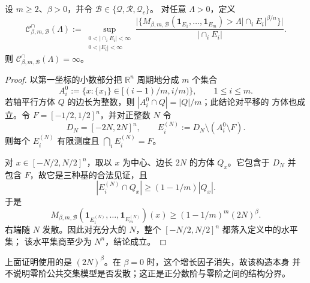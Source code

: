 \begin{proposition}[正分数阶下公共交集分母必然发散]\label{ml:intersection-divergence}
设 $m\geq2$、$\beta>0$，并令 $\mathcal B\in\{\mathcal Q,\mathcal R,\mathcal Q_c\}$。
对任意 $\Lambda>0$，定义
\[
 \mathcal C^{\cap}_{\beta,m,\mathcal B}(\Lambda)
 :=\sup_{\substack{0<|\cap_iE_i|<\infty\\0<|E_i|<\infty}}
 \frac{\bigl|\{M_{\beta,m,\mathcal B}(\mathbf1_{E_1},\ldots,\mathbf1_{E_m})
 >\Lambda|\cap_iE_i|^{\beta/n}\}\bigr|}{|\cap_iE_i|}.
\]
则 $\mathcal C^{\cap}_{\beta,m,\mathcal B}(\Lambda)=\infty$。
\end{proposition}

\begin{proof}
以第一坐标的小数部分把 $\mathbb R^n$ 周期地分成 $m$ 个集合
\[
 A_i^0:=\{x:\{x_1\}\in[(i-1)/m,i/m)\},\qquad 1\leq i\leq m.
\]
若轴平行方体 $Q$ 的边长为整数，则 $|A_i^0\cap Q|=|Q|/m$；此结论对平移的
方体也成立。令 $F=[-1/2,1/2]^n$，并对正整数 $N$ 令
\[
 D_N=[-2N,2N]^n,\qquad E_i^{(N)}:=D_N\setminus(A_i^0\setminus F).
\]
则每个 $E_i^{(N)}$ 有限测度且 $\bigcap_iE_i^{(N)}=F$。

对 $x\in[-N/2,N/2]^n$，取以 $x$ 为中心、边长 $2N$ 的方体 $Q_x$。它包含于 $D_N$ 并
包含 $F$，故它是三种基的合法见证，且
\[
 |E_i^{(N)}\cap Q_x|\geq(1-1/m)|Q_x|.
\]
于是
\[
 M_{\beta,m,\mathcal B}(\mathbf1_{E_1^{(N)}},\ldots,\mathbf1_{E_m^{(N)}})(x)
 \geq (1-1/m)^m(2N)^\beta.
\]
右端随 $N$ 发散。因此对充分大的 $N$，整个 $[-N/2,N/2]^n$ 都落入定义中的水平集；
该水平集商至少为 $N^n$，结论成立。
\end{proof}

\begin{remark}\label{ml:zero-order-boundary}
上面证明使用的是 $(2N)^\beta$。在 $\beta=0$ 时，这个增长因子消失，故该构造本身
并不说明零阶公共交集模型是否发散；这正是正分数阶与零阶之间的结构分界。
\end{remark}
